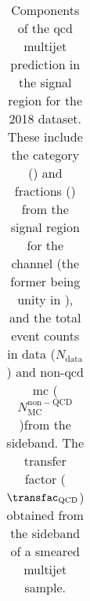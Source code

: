\begin{table}[htbp]
\begin{tabular*}{\linewidth}{@{\extracolsep{\fill}}llclcccr}
\bottomrule
\end{tabular*}
\caption[Components of the \acrshort{qcd} multijet prediction in the signal region for the 2018 dataset]{Components of the \acrshort{qcd} multijet prediction in the signal region for the 2018 dataset. These include the category (\catFraction) and \ptmiss fractions (\metFraction) from the signal region for the \ttH channel (the former being unity in \VH), and the total event counts in data ($N_{\mathrm{data}}$) and non-\acrshort{qcd} \acrshort{mc} ($N_{\mathrm{MC}}^{\mathrm{non-QCD}}$)from the sideband. The transfer factor ($\transfac_{\mathrm{QCD}}$) obtained from the sideband of a smeared multijet sample.}
\label{tab:htoinv_qcd_pred_2018}
\end{table}
